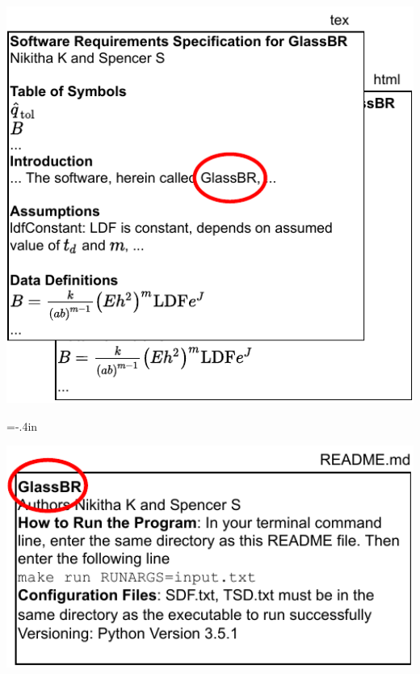 \documentclass[usenames]{beamer}
\begin{document}
\begin{frame}


\includegraphics[width=1.02\textwidth]{../figures/SRSCircleGlassBR.pdf}

\end{frame}
\hoffset=0in
\hoffset=-.4in
\begin{frame}


\includegraphics[width=1.05\textwidth]{../figures/READMECircleGlassBR.pdf}

\end{frame}
\end{document}
